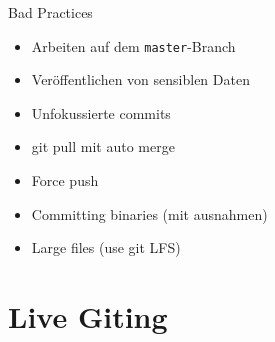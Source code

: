     \begin{frame}{Bad Practices}
        \slidehead
        \begin{itemize}
            \item Arbeiten auf dem \texttt{master}-Branch
            \item Veröffentlichen von sensiblen Daten
            \item Unfokussierte commits
            \item git pull mit auto merge
            \item Force push
            \item Committing binaries (mit ausnahmen)
            \item Large files (use git LFS)
        \end{itemize}
    \end{frame}


    \section{Live Giting}\label{sec:live-giting}


